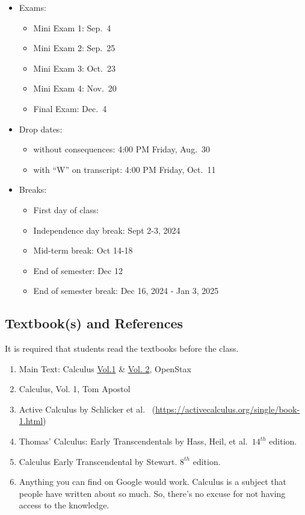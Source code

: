 \documentclass[
]{article}
\providecommand{\tightlist}{%
  \setlength{\itemsep}{0pt}\setlength{\parskip}{0pt}}
\begin{document}
\begin{itemize}
\tightlist
\item
  Exams:

  \begin{itemize}
  \tightlist
  \item
    Mini Exam 1: Sep.~4
  \item
    Mini Exam 2: Sep.~25
  \item
    Mini Exam 3: Oct.~23
  \item
    Mini Exam 4: Nov.~20
  \item
    Final Exam: Dec.~4
  \end{itemize}
\item
  Drop dates:

  \begin{itemize}
  \tightlist
  \item
    without consequences: 4:00 PM Friday, Aug.~30
  \item
    with ``W'' on transcript: 4:00 PM Friday, Oct.~11
  \end{itemize}
\item
  Breaks:

  \begin{itemize}
  \tightlist
  \item
    First day of class:
  \item
    Independence day break: Sept 2-3, 2024
  \item
    Mid-term break: Oct 14-18
  \item
    End of semester: Dec 12
  \item
    End of semester break: Dec 16, 2024 - Jan 3, 2025
  \end{itemize}
\end{itemize}

\subsection*{Textbook(s) and References}\label{textbooks-and-references}

It is required that students read the textbooks before the class.

\begin{enumerate}
\def\labelenumi{\arabic{enumi}.}
\item
  Main Text: Calculus \href{https://openstax.org/details/books/calculus-volume-1}{Vol.1} \& \href{https://openstax.org/details/books/calculus-volume-2}{Vol. 2}, OpenStax
\item
  Calculus, Vol. 1, Tom Apostol
\item
  Active Calculus by Schlicker et al.~
  (\url{https://activecalculus.org/single/book-1.html})
\item
  Thomas' Calculus: Early Transcendentals by Hass, Heil, et al.~\(14^{th}\) edition.
\item
  Calculus Early Transcendental by Stewart. \(8^{th}\) edition.
\item
  Anything you can find on Google would work.
  Calculus is a subject that people have written about
  so much. So, there's no excuse for not having access
  to the knowledge.
\end{enumerate}
\end{document}
